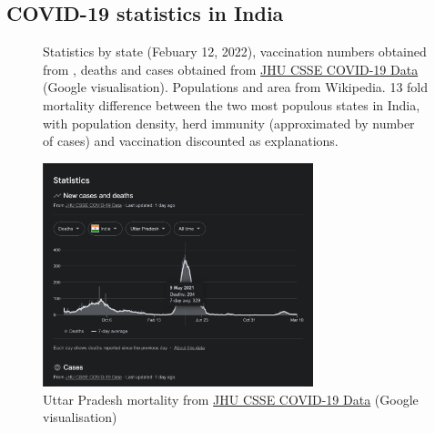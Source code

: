 \documentclass[11pt,a4paper,notitlepage]{report}
\begin{document}
\clearpage

\subsection*{COVID-19 statistics in India}


\begin{figure}[h]
    \centering
    \caption{Statistics by state (Febuary 12, 2022), vaccination numbers obtained from \cite{statistaIndiaVaccination}, deaths and cases obtained from \href{https://github.com/CSSEGISandData/COVID-19}{JHU CSSE COVID-19 Data} (Google visualisation). Populations and area from Wikipedia. 13 fold mortality difference between the two most populous states in India, with population density, herd immunity (approximated by number of cases) and vaccination discounted as explanations.}
    \label{fig:india-stats}
\end{figure}

\begin{figure}[h]
    \centering
    \includegraphics[width=0.7\textwidth]{india-uttarpradesh-mortality}
    \caption{Uttar Pradesh mortality from \href{https://github.com/CSSEGISandData/COVID-19}{JHU CSSE COVID-19 Data} (Google visualisation)}
    \label{fig:india-uttarpradesh-mortality}
\end{figure}
\end{document}
